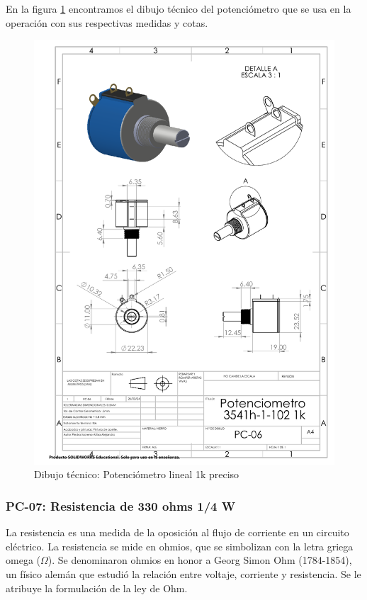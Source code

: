     En la figura \ref{fig:potenciometro} encontramos el dibujo técnico del potenciómetro que se usa en la operación con sus respectivas medidas y cotas.
    
    \begin{figure}[H]
        \centering
        \includegraphics[trim = {7mm 1mm 1mm 1mm},clip,scale=0.4]{22/Img/potenciometroDibujo.PDF}
        \caption{Dibujo técnico: Potenciómetro lineal 1k preciso}
        \label{fig:potenciometro}
    \end{figure}
    
    
    \subsubsection{PC-07: Resistencia de 330 ohms 1/4 W }
    La resistencia es una medida de la oposición al flujo de corriente en un circuito eléctrico. La resistencia se mide en ohmios, que se simbolizan con la letra griega omega ($\Omega$). Se denominaron ohmios en honor a Georg Simon Ohm (1784-1854), un físico alemán que estudió la relación entre voltaje, corriente y resistencia. Se le atribuye la formulación de la ley de Ohm.
    
